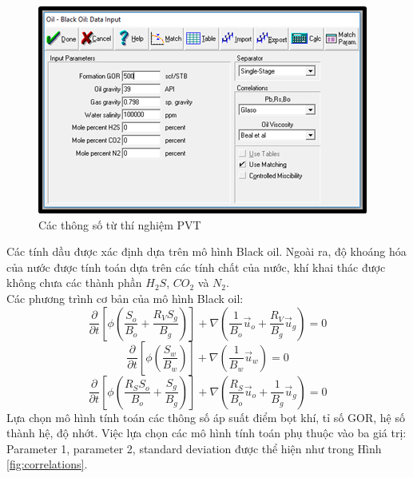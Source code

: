 \documentclass[12pt,a4paper]{report}
\begin{document}
		\begin{figure}[h]
        	\centering
            \includegraphics[scale=1.3]{Fig/pvt_input.png}
            \caption{Các thông số từ thí nghiệm PVT}
            \label{fig:pvt_input}
        \end{figure}
        \newline
Các tính dầu được xác định dựa trên mô hình Black oil. Ngoài ra, độ khoáng hóa của nước được tính toán dựa trên các tính chất của nước, khí khai thác được không chưa các thành phần $H_2S$, $CO_2$ và $N_2$.\\
Các phương trình cơ bản của mô hình Black oil:
		\begin{equation}
        	\dfrac{\partial}{\partial t}\left[\phi\left(\dfrac{S_o}{B_o}+\dfrac{R_VS_g}{B_g}\right)\right]+\nabla\left(\dfrac{1}{B_o}\vec{u}_o+\dfrac{R_V}{B_g}\vec{u}_g\right)=0
        \end{equation}
        \begin{equation}
        	\dfrac{\partial}{\partial t}\left[\phi\left(\dfrac{S_w}{B_w}\right)\right]+\nabla\left(\dfrac{1}{B_w}\vec{u}_w\right)=0
        \end{equation}
        \begin{equation}
        	\dfrac{\partial}{\partial t}\left[\phi\left(\dfrac{R_SS_o}{B_o}+\dfrac{S_g}{B_g}\right)\right]+\nabla\left(\dfrac{R_S}{B_o}\vec{u}_o+\dfrac{1}{B_g}\vec{u}_g\right)=0
        \end{equation}
\newpage
\noindent
Lựa chọn mô hình tính toán các thông số áp suất điểm bọt khí, tỉ số GOR, hệ số thành hệ, độ nhớt. Việc lựa chọn các mô hình tính toán phụ thuộc vào ba giá trị: Parameter 1, parameter 2, standard deviation được thể hiện như trong Hình \ref{fig:correlations}.
\end{document}
